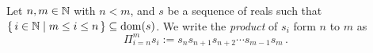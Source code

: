\guard



\begin{defn}
\label{defn:sumOfSequence}
  Let $n,m\in\mathbb{N}$ with $n<m$, and $s$ be a sequence of reals such that $\left\{\,i\in\mathbb{N}\mid m\leq i\leq n\,\right\}\subseteq \mathrm{dom}(s)$.
  We write the \emph{product} of $s_i$ form $n$ to $m$ as \[ \Pi_{i=n}^m s_i := s_n s_{n+1} s_{n+2} \cdots s_{m-1} s_m\,.\]
\end{defn}
